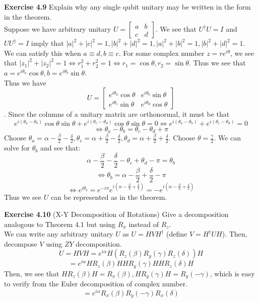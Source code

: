 \documentclass{article}
\begin{document}
\begin{tcolorbox}\textbf{Exercise 4.9} Explain why any single qubit unitary may be written in the form in the theorem.\\
	Suppose we have arbitrary unitary $U = \begin{bmatrix} a & b \\ c & d\end{bmatrix}$. We see that $U^\dag U = I$ and $UU^\dag = I$ imply that $|a|^2 + |c|^2 = 1, |b|^2 +|d|^2 = 1, |a|^2 + |b|^2 = 1, |b|^2 + |d|^2 =1$.\\
	We can satisfy this when $a \equiv d,b \equiv c$. For some complex number $z = re^{i\theta}$, we see that $|z_1|^2 + |z_2|^2 =1 \iff r_1^2 + r^2_2 = 1 \iff r_1 = \cos\theta, r_2 = \sin \theta$. Thus we see that $a = e^{i\theta_a} \cos \theta, b =e^{i\theta_b} \sin \theta$.\\
	Thus we have $$ U = \begin{bmatrix} e^{i\theta_a} \cos\theta & e^{i \theta_b} \sin \theta \\ e^{i\theta_c} \sin\theta &e^{i\theta_d} \cos\theta \end{bmatrix}$$. Since the columns of a unitary matrix are orthonormal, it must be that $$e^{i(\theta_a - \theta_b)} \cos\theta \sin\theta + e^{i (\theta_c - \theta_d)} \cos\theta \sin\theta = 0 \iff e^{i(\theta_a - \theta_b)} + e^{i(\theta_c - \theta_d)}= 0$$
	$$\iff \theta_a - \theta_b = \theta_c - \theta_d + \pi$$
	Choose $\theta_a = \alpha - \frac{\beta}{2} - \frac{\delta}{2}, \theta_c = \alpha + \frac{\beta}{2} - \frac{\delta}{2}, \theta_d = \alpha + \frac{\beta}{2} + \frac{\delta}{2}$. Choose $\theta = \frac{\gamma}{2}$.
	We can solve for $\theta_b$ and see that:
	$$\alpha - \frac{\beta}{2} - \frac{\delta}{2} - \theta_c + \theta_d - \pi = \theta_b$$
	$$\iff \theta_b = \alpha - \frac{\beta}{2} + \frac{\delta}{2} - \pi$$
	$$\iff e^{i\theta_b} = e^{-i\pi} e^{i(\alpha - \frac{\beta}{2} + \frac{\delta}{2})} = - e^{i(\alpha - \frac{\beta}{2} + \frac{\delta}{2})} $$
	Thus we see $U$ can be represented as in the theorem.

\end{tcolorbox}
\begin{tcolorbox}\textbf{Exercise 4.10} (X-Y Decomposition of Rotations) Give a decomposition analogous to Theorem 4.1 but using $R_x$ instead of $R_z$. \\
	We can write any arbitrary unitary $U$ as $U= HVH^\dag$ (define $V = H^\dag UH$). Then, decompose $V$ using $ZY$ decomposition. 
	$$U = HVH = e^{i\alpha} H(R_z(\beta)R_y(\gamma)R_z(\delta))H$$
	$$= e^{i\alpha} HR_z(\beta)H HR_y(\gamma)H HR_z(\delta)H$$
	Then, we see that $HR_z(\beta)H = R_x(\beta), HR_y (\gamma)H = R_y(-\gamma)$, which is easy to verify from the Euler decomposition of complex number.
	$$= e^{i\alpha} R_x(\beta) R_y(-\gamma) R_x(\delta)$$
\end{tcolorbox}
\end{document}
